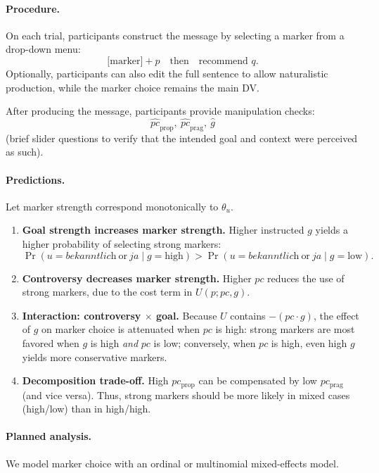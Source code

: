 \documentclass[12pt]{article}
\begin{document}
\paragraph{Procedure.}
On each trial, participants construct the message by selecting a marker from a drop-down menu:
\[
\text{[marker]} + p \quad\text{then}\quad \text{recommend } q.
\]
Optionally, participants can also edit the full sentence to allow naturalistic production, while the marker choice remains the main DV.

After producing the message, participants provide manipulation checks:
\[
\widehat{pc}_{\text{prop}},\ \widehat{pc}_{\text{prag}},\ \widehat{g}
\]
(brief slider questions to verify that the intended goal and context were perceived as such).

\paragraph{Predictions.}
Let marker strength correspond monotonically to $\theta_u$.

\begin{enumerate}
\item \textbf{Goal strength increases marker strength.}
Higher instructed $g$ yields a higher probability of selecting strong markers:
\[
\Pr(u=\textit{bekanntlich}\ \text{or}\ \textit{ja} \mid g=\text{high})
>
\Pr(u=\textit{bekanntlich}\ \text{or}\ \textit{ja} \mid g=\text{low}).
\]
\item \textbf{Controversy decreases marker strength.}
Higher $pc$ reduces the use of strong markers, due to the cost term in $U(p;pc,g)$.
\item \textbf{Interaction: controversy $\times$ goal.}
Because $U$ contains $-(pc\cdot g)$, the effect of $g$ on marker choice is attenuated when $pc$ is high:
strong markers are most favored when $g$ is high \emph{and} $pc$ is low; conversely, when $pc$ is high, even high $g$ yields more conservative markers.
\item \textbf{Decomposition trade-off.}
High $pc_{\text{prop}}$ can be compensated by low $pc_{\text{prag}}$ (and vice versa). Thus, strong markers should be more likely in mixed cases (high/low) than in high/high.
\end{enumerate}

\paragraph{Planned analysis.}
We model marker choice with an ordinal or multinomial mixed-effects model.
\end{document}
